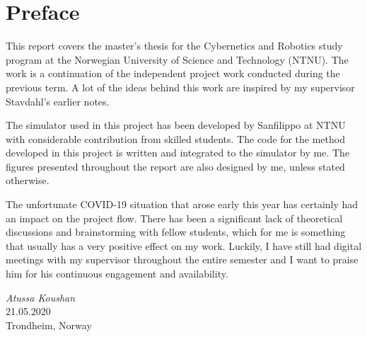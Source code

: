 \chapter{Preface}

This report covers the master's thesis for the Cybernetics and Robotics study program at the Norwegian University of Science and Technology (NTNU). The work is a continuation of the independent project work conducted during the previous term. A lot of the ideas behind this work are inspired by my supervisor Stavdahl's earlier notes.

The simulator used in this project has been developed by Sanfilippo at NTNU with considerable contribution from skilled students. The code for the method developed in this project is written and integrated to the simulator by me. The figures presented throughout the report are also designed by me, unless stated otherwise.

The unfortunate COVID-19 situation that arose early this year has certainly had an impact on the project flow.  %
There has been a significant lack of theoretical discussions and brainstorming with fellow students, which for me is something that usually has a very positive effect on my work. Luckily, I have still had digital meetings with my supervisor throughout the entire semester  
and I want to praise him for his continuous engagement and availability.


\medskip
\begin {flushright}
  \textit{Atussa Koushan} \\
  \textsc {21.05.2020} \\
  Trondheim, Norway
\end {flushright}



\makeatletter
{}


\makeatother




